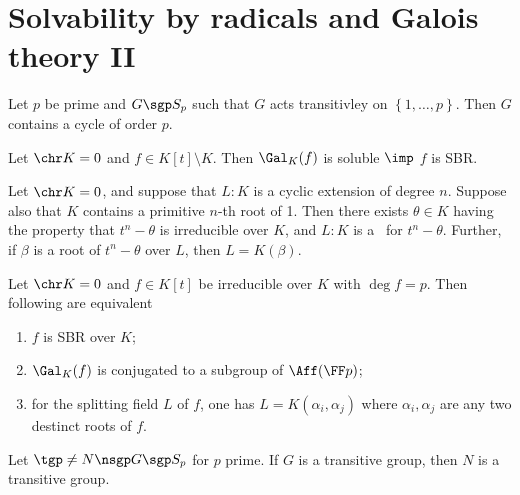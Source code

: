 \documentclass[a4paper]{article}
\begin{document}
\section{Solvability by radicals and Galois theory II}
\begin{tlemma}
  Let \( p \) be prime and \( G\sgp S_p \) such that \( G \) acts transitivley on \( \left\{ 1,\dots,p \right\} \).
  Then \( G \) contains a cycle of order \( p \).
\end{tlemma}

\begin{ttheorem}
  Let \( \chr K = 0 \) and \( f\in K[t]\setminus K \).
  Then \( \Gal_K(f) \) is soluble \( \imp \) \( f \) is SBR.
\end{ttheorem}

\begin{tlemma}[Wooley 14.8]
  Let \( \chr K = 0 \), and suppose that \( L:K \) is a cyclic extension of degree \( n \).
  Suppose also that \( K \) contains a primitive \( n \)-th root of 1.
  Then there exists \( \theta \in K \) having the property that \( t^n -\theta \) is irreducible over \( K \), and \( L:K \) is a \sf~for \( t^n-\theta \).
  Further, if \( \beta \) is a root of \( t^n-\theta \) over \( L \), then \( L=K(\beta) \).
\end{tlemma}

\begin{ttheorem}
  Let \( \chr K = 0 \) and \( f\in K[t] \) be irreducible over \( K \) with \( \deg f = p \).
  Then following are equivalent
  \begin{enumerate}
    \item \( f \) is SBR over \( K \);
    \item \( \Gal_K(f) \) is conjugated to a subgroup of \( \Aff(\FF p) \);
    \item for the splitting field \( L \) of \( f \), one has \( L = K(\alpha_i,\alpha_j) \) where \( \alpha_i,\alpha_j \) are any two destinct roots of \( f \).
  \end{enumerate}
\end{ttheorem}

\begin{tlemma}
  Let \( \tgp \neq N \nsgp G \sgp S_p \) for \( p \) prime.
  If \( G \) is a transitive group, then \( N \) is a transitive group.
\end{tlemma}
\end{document}
